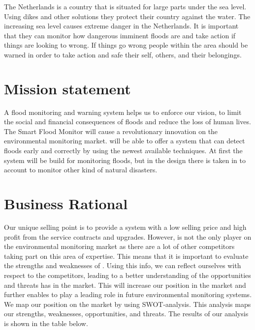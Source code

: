 The Netherlands is a country that is situated for large parts under the sea level. Using dikes and other solutions they protect their country against the water. The increasing sea level causes extreme danger in the Netherlands. It is important that they can monitor how dangerous imminent floods are and take action if things are looking to wrong. If things go wrong people within the area should be warned in order to take action and safe their self, others, and their belongings.

\section{Mission statement}
A flood monitoring and warning system helps us to enforce our vision, to limit the social and financial consequences of floods and reduce the loss of human lives. \\
The Smart Flood Monitor will cause a revolutionary innovation on the environmental monitoring market. \CompanyName{} will be able to offer a system that can detect floods early and correctly by using the newest available techniques. At first the system will be build for monitoring floods, but in the design there is taken in to account to monitor other kind of natural disasters.

\section{Business Rational}



Our unique selling point is to provide a system with a low selling price and high profit from the service contracts and upgrades. However, \CompanyName{} is not the only player on the environmental monitoring market as there are a lot of other competitors taking part on this area of expertise. This means that it is important to evaluate the strengths and weaknesses of \CompanyName. Using this info, we can reflect ourselves with respect to the competitors, leading to a better understanding of the opportunities and threats \CompanyName has in the market.
This will increase our position in the market and further enables \CompanyName to play a leading role in future environmental monitoring systems.\\

We map our position on the market by using SWOT-analysis. This analysis maps our strengths, weaknesses, opportunities, and threats. The results of our analysis is shown in the table below.

